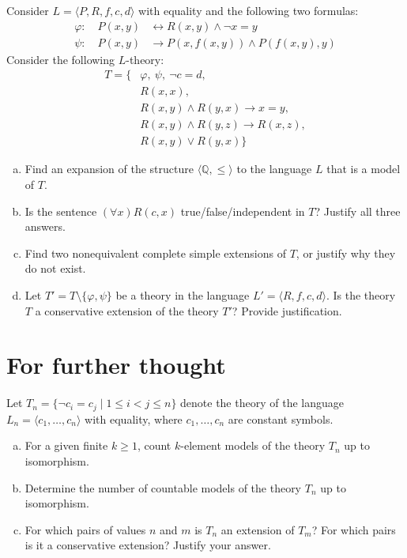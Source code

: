 \begin{problem}

    Consider $L=\langle P,R,f,c,d\rangle$ with equality and the following two formulas:
    \begin{align*}
        \varphi:\quad P(x,y) &\leftrightarrow R(x,y) \wedge \neg x=y\\
        \psi:\quad P(x,y) &\to P(x,f(x,y)) \wedge P(f(x,y),y)
    \end{align*}
    Consider the following $L$-theory:
    \begin{align*}
        T=\{&\varphi,\ \psi,\ \neg c=d,\\
        &R(x,x),\\ 
        &R(x,y) \wedge R(y,x) \to x=y,\\
        &R(x,y) \wedge R(y,z) \to R(x,z),\\
        &R(x,y) \vee R(y,x)\}    
    \end{align*}
    

    \begin{enumerate}[(a)]
        \item Find an expansion of the structure $\langle \mathbb{Q},\le \rangle$ to the language $L$ that is a model of $T$.
        \item Is the sentence $(\forall x)R(c,x)$ true/false/independent in $T$? Justify all three answers.
        \item Find two nonequivalent complete simple extensions of $T$, or justify why they do not exist.
        \item Let $T'=T\setminus\{\varphi,\psi\}$ be a theory in the language $L'=\langle R,f,c,d\rangle$. Is the theory $T$ a conservative extension of the theory $T'$? Provide justification.
    \end{enumerate}

\end{problem}

        
\section*{For further thought}


\begin{problem}

    Let $T_n = \{\neg c_i = c_j \mid 1 \leq i < j \leq n\}$ denote the theory of the language $L_n = \langle c_1, \dots, c_n \rangle$ with equality, where $c_1, \dots, c_n$ are constant symbols.
    \begin{enumerate}[(a)]   
        \item For a given finite $k \geq 1$, count $k$-element models of the theory $T_n$ up to isomorphism. 
        \item Determine the number of countable models of the theory $T_n$ up to isomorphism. 
        \item For which pairs of values $n$ and $m$ is $T_n$ an extension of $T_m$? For which pairs is it a conservative extension? Justify your answer.
    \end{enumerate}

\end{problem}




